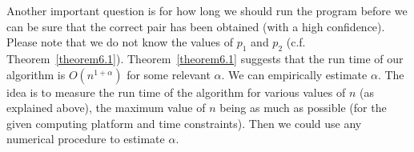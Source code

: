 \documentclass{article}
\theoremstyle{definition}
\theoremstyle{remark}
\begin{document}
\begin{table}[ht]
\centering  {}
\vspace{0.2in}
\caption{No of pairs comparison on \protect\linebreak NOISE data set}\label{table5} \end{table}

\begin{table}[ht]
\centering  {}
\vspace{0.2in}
\caption{No of pairs comparison on \protect\linebreak synthetic data with injected pairs}\label{table6} \end{table}


 Another important question is for how long we should run the program before we can be sure that the correct pair has been obtained (with a high confidence). Please note that we do not know the values of $p_1$ and $p_2$ (c.f. Theorem~\ref{theorem6.1}). Theorem~\ref{theorem6.1} suggests that the run time of our algorithm is $O(n^{1+\alpha})$ for some relevant $\alpha$. We can empirically estimate $\alpha$. The idea is to measure the run time of the algorithm for various values of $n$ (as explained above), the maximum value of $n$ being as much as possible (for the given computing platform and time constraints). Then we could use any numerical procedure to estimate $\alpha$.
\end{document}
